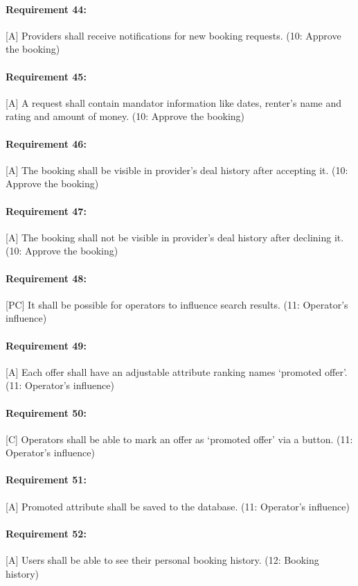 \paragraph{Requirement 44:} [A] Providers shall receive notifications for new booking requests. (10: Approve the booking)
\paragraph{Requirement 45:} [A] A request shall contain mandator information like dates, renter's name and rating and amount of money. (10: Approve the booking)
\paragraph{Requirement 46:} [A] The booking shall be visible in provider's deal history after accepting it. (10: Approve the booking)
\paragraph{Requirement 47:} [A] The booking shall not be visible in provider's deal history after declining it. (10: Approve the booking)

\paragraph{Requirement 48:} [PC] It shall be possible for operators to influence search results. (11: Operator's influence)
\paragraph{Requirement 49:} [A] Each offer shall have an adjustable attribute ranking names ‘promoted offer'. (11: Operator's influence)
\paragraph{Requirement 50:} [C] Operators shall be able to mark an offer as ‘promoted offer' via a button. (11: Operator's influence)
\paragraph{Requirement 51:} [A] Promoted attribute shall be saved to the database. (11: Operator's influence)

\paragraph{Requirement 52:} [A] Users shall be able to see their personal booking history. (12: Booking history)

